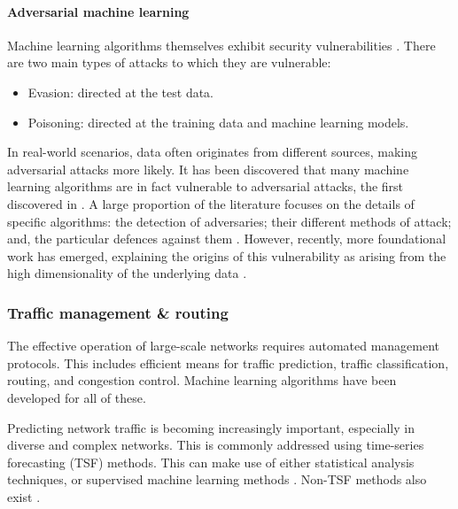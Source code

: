 \paragraph{Adversarial machine learning}

Machine learning algorithms themselves exhibit security vulnerabilities \cite{bib:huang2011adversarial}. There are two main types of attacks to which they are vulnerable:
\begin{itemize}
\item Evasion: directed at the test data.
\item Poisoning: directed at the training data and machine learning models.
\end{itemize}

In real-world scenarios, data often originates from different sources, making adversarial attacks more likely. It has been discovered that many machine learning algorithms are in fact vulnerable to adversarial attacks, the first discovered in \cite{bib:szegedy2013intriguing}. A large proportion of the literature focuses on the details of specific algorithms: the detection of adversaries; their different methods of attack; and, the particular defences against them \cite{bib:kurakin2018adversarial}. However, recently, more foundational work has emerged, explaining the origins of this vulnerability as arising from the high dimensionality of the underlying data \cite{bib:goodfellow2014explaining, bib:gilmer2018adversarial, bib:mahloujifar2018curse}.

\subsubsection{Traffic management \& routing }

The effective operation of large-scale networks requires automated management protocols. This includes efficient means for traffic prediction, traffic classification, routing, and congestion control. Machine learning algorithms have been developed for all of these.

Predicting network traffic is becoming increasingly important, especially in diverse and complex networks. This is commonly addressed using time-series forecasting (TSF) methods. This can make use of either statistical analysis techniques, or supervised machine learning methods \cite{bib:bermolen2009support, bib:chabaa2010identification, bib:cortez2006internet}. Non-TSF methods also exist \cite{bib:chen2016predicting, bib:li2016inter}.

